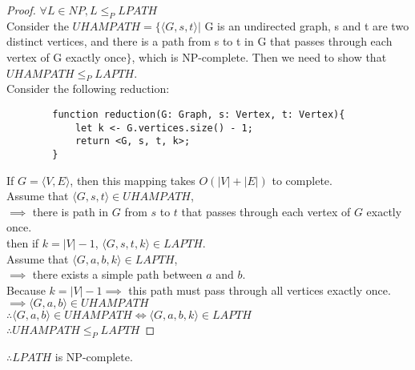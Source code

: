 \documentclass[letterpaper]{article}
\begin{document}
\begin{proof}
    $\forall L \in NP, L \leq_P LPATH$\\
    Consider the $UHAMPATH = \{ \langle G,s, t \rangle | $ G is an undirected graph, s and
    t are two distinct vertices, and there is a path from s to t in
    G that passes through each vertex of G exactly once$ \}$, which is NP-complete. Then we need to show that
    $UHAMPATH \leq_P LAPTH$.\\
    Consider the following reduction:
    \begin{verbatim}
        function reduction(G: Graph, s: Vertex, t: Vertex){
            let k <- G.vertices.size() - 1;
            return <G, s, t, k>;
        }
    \end{verbatim}
    If $G = \langle V, E \rangle$, then this mapping takes $O(|V| + |E|)$ to complete.\\
    Assume that $\langle G, s, t \rangle \in UHAMPATH$,\\
    $\implies$ there is path in $G$ from $s$ to $t$ that passes through each vertex of $G$ exactly once.\\
    then if $k = |V| - 1$, $\langle G,s,t,k \rangle \in LAPTH$.\\
    Assume that $\langle G,a,b,k \rangle \in LAPTH$,\\
    $\implies$ there exists a simple path between $a$ and $b$.\\
    Because $k=|V| - 1 \implies$ this path must pass through all vertices exactly once.\\
    $\implies \langle G,a,b \rangle \in UHAMPATH$\\
    $\therefore \langle G,a,b \rangle \in UHAMPATH \iff \langle G,a,b,k \rangle \in LAPTH$\\
    $\therefore UHAMPATH \leq_P LAPTH$
\end{proof}
$\therefore LPATH$ is NP-complete.
\end{document}
